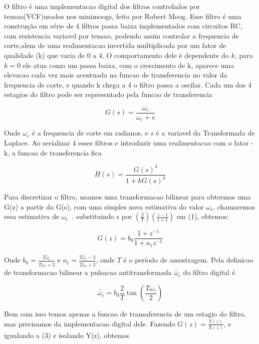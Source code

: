 \documentclass{article}
\begin{document}
O filtro é uma implementacao digital dos filtros controlados por tensao(VCF)usados nos minimoogs, feito por Robert Moog. Esse filtro é uma construção em série de 4 filtros passa baixa implementados com circuitos RC, com resistencia variavel por tensao, podendo assim controlar a frequencia de corte,alem de uma realimentacao invertida multiplicada por um fator de qualidade (k) que varia de 0 a 4.
O comportamento dele é dependente do $k$, para $k=0$ ele atua como um passa baixa, com o crescimento de k, aparece uma elevacao 
cada vez mais acentuada na funcao de transferencia no valor da frequencia de corte, e quando k chega a 4 o filtro passa a oscilar.
Cada um dos 4 estagios do filtro pode ser representado pela funcao de transferencia

\begin{equation}\label{eq:(1)}
G(s) = \frac{\omega_c}{\omega_c+s}  
\end{equation}

Onde $\omega_c$ é a frequencia de corte em radianos, e $s$ é a variavel da Transformada de Laplace.
Ao serializar 4 esses filtros e introduzir uma realimentacao com o fator -k, a funcao de transferencia fica

\begin{equation}\label{eq:(2)}
 H(s) = \frac{G(s)^4}{1+k G(s)^4} 
\end{equation}


Para discretizar o filtro, usamos uma transformacao bilinear para obtermos uma G(z) a partir da G(s), 
com uma simples nova estimativa do valor $\omega_c$, chamaremos essa estimativa de $\omega_c$~.
substituindo s por $(\frac{2}{T})(\frac{z-1}{z+1})$ em (1), obtemos:

\begin{equation}\label{eq:(3)}
G(z) = b_0 \frac{1+z^{-1}}{1+a_1 z^{-1}}  
\end{equation}


Onde $b_0 = \frac{T \tilde{\omega_c}}{T \tilde{\omega_c}+2}$ e $a_1 = \frac{T \tilde{\omega_c} -2}{T\tilde{\omega_c} +2}$, onde $T$ é o período de amostragem.
Pela definicao de transformacao bilinear a pulsacao antitransformada $\tilde{\omega_c}$ do filtro digital é

\begin{equation}\label{eq:(4)}
\tilde{\omega_c} = b_0 \frac{2}{T} \tan({\frac{T \omega_c}{2}} ) 
\end{equation}

Bem com isso temos apenas a funcao de transaferencia de um estagio do filtro, mas precisamos da implementacao digital dele.
Fazendo $G(z) = \frac{Y(z)}{X(z)}$, e igualando a (3) e isolando Y(z), obtemos
\end{document}
